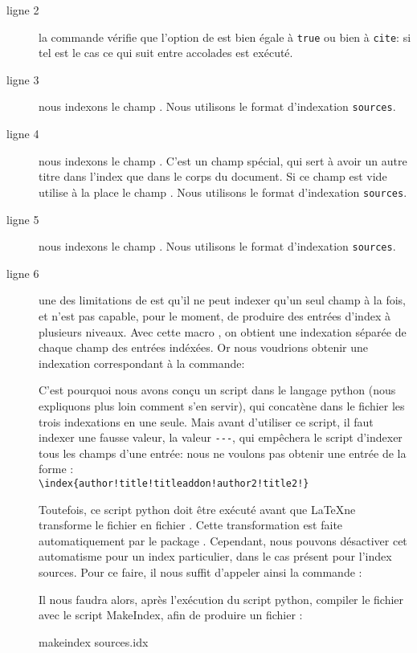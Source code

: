 \begin{description}
\item[ligne 2] la commande  vérifie que l'option  de  est bien égale à \verb|true| ou bien à \verb|cite|: si tel est le cas ce qui suit entre accolades est exécuté.
\item[ligne 3] nous indexons le champ .  Nous utilisons le format d'indexation \verb|sources|.
\item[ligne 4] nous indexons le champ . C'est un champ spécial, qui sert à avoir un autre titre dans l'index que dans le corps du document. Si ce champ est vide  utilise à la place le champ . Nous utilisons le format d'indexation \verb|sources|.
\item[ligne 5] nous indexons le champ . Nous utilisons le format d'indexation \verb|sources|.
\item[ligne 6]  une des limitations de  est qu'il ne peut indexer qu'un seul champ à la fois, et n'est pas capable, pour le moment, de produire des entrées d'index à plusieurs niveaux. 
Avec cette macro , on obtient une indexation séparée de chaque champ des entrées indéxées. 
Or nous voudrions obtenir une indexation correspondant à la commande:
\begin{latexcode} 
\end{latexcode}
 C'est pourquoi nous avons conçu un script dans le langage python (nous expliquons plus loin comment s'en servir), qui concatène dans le fichier  les trois indexations en une seule.
Mais avant d'utiliser ce script, il faut  indexer une fausse valeur, la valeur \verb|---|, qui empêchera le script d'indexer tous les champs d'une entrée: nous ne voulons pas obtenir une entrée de la forme : \\
 \verb|\index{author!title!titleaddon!author2!title2!}|
 
 Toutefois, ce script python doit être exécuté avant que \LaTeX ne transforme le fichier  en fichier . Cette transformation est faite automatiquement par le package . Cependant, nous pouvons désactiver cet automatisme pour un index particulier, dans le cas présent pour l'index sources. Pour ce faire, il nous suffit d'appeler ainsi la commande  :

\begin{latexcode}
\makeindex[name=sources,title=Index des sources,noautomatic]
\end{latexcode}

Il nous faudra alors, après l'exécution du script python, compiler le fichier  avec le script MakeIndex, afin de produire un fichier  :
\begin{bashcode}
makeindex sources.idx
\end{bashcode}
\end{description}


